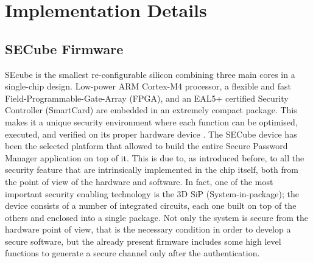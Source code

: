 \chapter{Implementation Details}
\label{sec:implementation-details}



\section{SECube Firmware}
SEcube is the smallest re-configurable silicon combining three main cores in a single-chip design. Low-power ARM Cortex-M4 processor, a flexible and fast Field-Programmable-Gate-Array (FPGA), and an EAL5+ certified Security Controller (SmartCard) are embedded in an extremely compact package. This makes it a unique security environment where each function can be optimised, executed, and verified on its proper hardware device \cite{secubesite}.
The SECube device has been the selected platform that allowed to build the entire Secure Password Manager application on top of it. This is due to, as introduced before, to all the security feature that are intrinsically implemented in the chip itself, both from the point of view of the hardware and software.\newline\newline
In fact, one of the most important security enabling technology is the 3D SiP (System-in-package); the device consists of a number of integrated circuits, each one built on top of the others and enclosed into a single package.\newline\newline
Not only the system is secure from the hardware point of view, that is the necessary condition in order to develop a secure software, but the already present firmware includes some high level functions to generate a secure channel only after the authentication.


